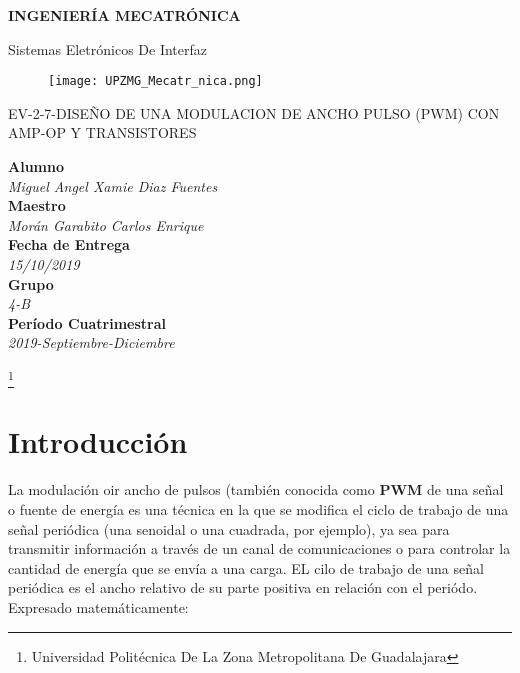 \documentclass[11pt,a4paper]{article}
\author{Miguel Angel Xamie Diaz Fuentes}
\begin{document}
\begin{center}
\begin{LARGE}
\textbf{INGENIERÍA MECATRÓNICA}\\
\end{LARGE}
{\large Sistemas Eletrónicos De Interfaz}\\
\begin{figure}[hbtp]
\centering
\texttt{[image: UPZMG\_Mecatr\_nica.png]}
\end{figure} 
\begin{center}
\begin{LARGE}
EV-2-7-DISEÑO DE UNA MODULACION DE ANCHO PULSO (PWM) CON AMP-OP Y TRANSISTORES
\end{LARGE}
\end{center}

\begin{Large}
\textbf{Alumno}
\\\textit{Miguel Angel Xamie Diaz Fuentes}
\textbf{\\Maestro}
\\\textit{Morán Garabito Carlos Enrique}
\textbf{\\Fecha de Entrega}
\\\textit{15/10/2019}
\textbf{\\Grupo}
\\\textit{4-B}\\
\textbf{Período Cuatrimestral}\\
\textit{2019-Septiembre-Diciembre}
\\
\end{Large}

\end{center}

\footnote{Universidad Politécnica De La Zona Metropolitana De Guadalajara} 

\newpage

\section{Introducción}

\begin{flushleft}
La modulación oir ancho de pulsos (también conocida como \textbf{PWM} de una señal o fuente de energía es una técnica en la que se modifica el ciclo de trabajo de una señal periódica (una senoidal o una cuadrada, por ejemplo), ya sea para transmitir información a través de un canal de comunicaciones o para controlar la cantidad de energía que se envía a una carga. EL cilo de trabajo de una señal periódica es el ancho relativo de su parte positiva en relación con el periódo. Expresado matemáticamente:\\
\end{flushleft}
\end{document}
